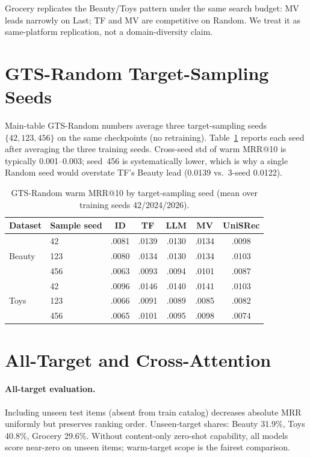 \documentclass[sigconf,natbib=true,anonymous]{acmart}
\begin{document}
Grocery replicates the Beauty/Toys pattern under the same search budget: MV leads narrowly on Last; TF and MV are competitive on Random.
We treat it as same-platform replication, not a domain-diversity claim.

\section{GTS-Random Target-Sampling Seeds}
\label{app:random-seeds}

Main-table GTS-Random numbers average three target-sampling seeds $\{42,123,456\}$ on the same checkpoints (no retraining).
Table~\ref{tab:random-seeds} reports each seed after averaging the three training seeds.
Cross-seed std of warm MRR@10 is typically 0.001--0.003; seed~456 is systematically lower, which is why a single Random seed would overstate TF's Beauty lead (0.0139 vs.\ 3-seed 0.0122).

\begin{table}[h]
\centering
\caption{GTS-Random warm MRR@10 by target-sampling seed (mean over training seeds 42/2024/2026).}
\label{tab:random-seeds}
\small
\setlength{\tabcolsep}{3pt}
\begin{tabular}{@{}llccccc@{}}
\toprule
Dataset & Sample seed & ID & TF & LLM & MV & UniSRec \\
\midrule
\multirow{3}{*}{Beauty}
 & 42    & .0081 & .0139 & .0130 & .0134 & .0098 \\
 & 123   & .0080 & .0134 & .0130 & .0134 & .0103 \\
 & 456   & .0063 & .0093 & .0094 & .0101 & .0087 \\
\midrule
\multirow{3}{*}{Toys}
 & 42    & .0096 & .0146 & .0140 & .0141 & .0103 \\
 & 123   & .0066 & .0091 & .0089 & .0085 & .0082 \\
 & 456   & .0065 & .0101 & .0095 & .0098 & .0074 \\
\bottomrule
\end{tabular}
\end{table}

\section{All-Target and Cross-Attention}
\label{app:alltarget}

\paragraph{All-target evaluation.}
Including unseen test items (absent from train catalog) decreases absolute MRR uniformly but preserves ranking order.
Unseen-target shares: Beauty 31.9\%, Toys 40.8\%, Grocery 29.6\%.
Without content-only zero-shot capability, all models score near-zero on unseen items; warm-target scope is the fairest comparison.
\end{document}
